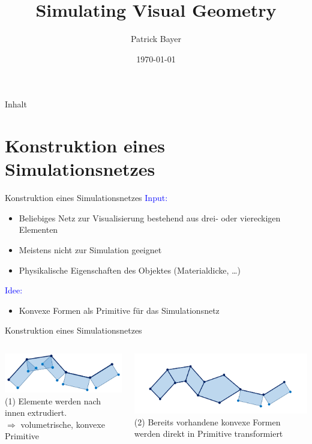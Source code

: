 \documentclass[t]{beamer}
\date{\today}
\title{Simulating Visual Geometry}
\author{Patrick Bayer}
\begin{document}
	\begin{frame}
		\titlepage
	\end{frame}

	\begin{frame}{Inhalt}
		\tableofcontents
	\end{frame}

	\section{Konstruktion eines Simulationsnetzes}
	\begin{frame}{Konstruktion eines Simulationsnetzes}
		\textcolor{blue}{Input:}	
		\begin{itemize}
			\item Beliebiges Netz zur Visualisierung bestehend aus drei- oder viereckigen Elementen
			\item Meistens nicht zur Simulation geeignet
			\item Physikalische Eigenschaften des Objektes (Materialdicke, \dots)
		\end{itemize}
		\textcolor{blue}{Idee:}
			\begin{itemize}
					\item Konvexe Formen als Primitive für das Simulationsnetz
			\end{itemize}
		\end{frame}

	\begin{frame}{Konstruktion eines Simulationsnetzes}
		\begin{columns}
			\column{0.5\textwidth}
				\centering
				\includegraphics[scale = 0.4]{PhysicalMeshCreation_Step1.png}\\
				(1) Elemente werden nach innen extrudiert.\\
				$\Rightarrow$ volumetrische, konvexe Primitive
			
			\column{0.5\textwidth}
					\centering
					\includegraphics[scale = 0.31]{PhysicalMeshCreation_2}\\
					(2) Bereits vorhandene konvexe Formen werden direkt in Primitive transformiert
		\end{columns}
	\end{frame}
		
\end{document}
